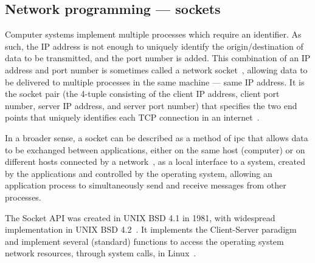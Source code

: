 \subsection{Network programming --- sockets}%
\label{sec:netw-progr-sock}
Computer systems implement multiple processes which require an identifier. As
such, the IP address is not enough to uniquely identify the origin/destination
of data to be transmitted, and the port number is added. This combination of an
IP address and port number is sometimes called a network socket~\cite{wright1995tcp}, allowing
data to be delivered to multiple processes in the same machine --- same IP
address.
It is the socket pair (the 4-tuple consisting of the client IP address, client
port number, server IP address, and server port number) that specifies the two
end points that uniquely identifies each TCP connection in an
internet~\cite{wright1995tcp}. 

In a broader sense, a socket can be described as a method of \gls{ipc} that allows data to be exchanged between applications, either on
the same host (computer) or on different hosts connected by a network~\cite{kerrisk2010linux}, as a
local interface to a system, created by the applications and controlled by the
operating system, allowing an application process to simultaneously send and
receive messages from other processes.

The Socket API was created in UNIX BSD 4.1 in 1981, with widespread
implementation in UNIX BSD 4.2~\cite{kerrisk2010linux}. It implements the Client-Server paradigm and
implement several (standard) functions to access the operating system network
resources, through system calls, in Linux~\cite{kerrisk2010linux}.

